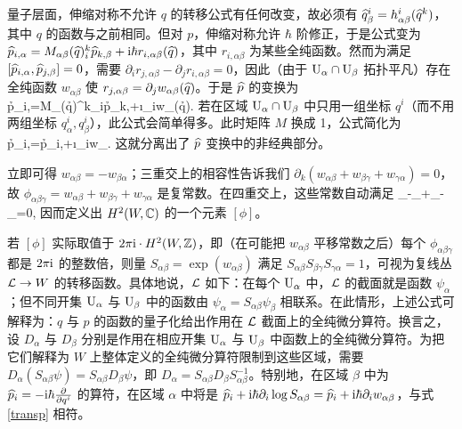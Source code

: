 量子层面，伸缩对称不允许 $q$ 的转移公式有任何改变，故必须有 $\widehat q^i_\beta=h^i_{\alpha\beta}(\widehat q^k)$，其中 $q$ 的函数与之前相同。但对 $p$，伸缩对称允许 $\hbar$ 阶修正，于是公式变为 $\widehat p_{i,\alpha}=M_{\alpha\beta}(\widehat q)^k_i\widehat p_{k,\beta}+{\mathrm i}\hbar r_{i,\alpha\beta}(\widehat q)$，其中 $r_{i,\alpha\beta}$ 为某些全纯函数。然而为满足 $[\widehat p_{i,\alpha},\widehat p_{j,\beta}]=0$，需要 $\partial_ir_{j,\alpha\beta}-\partial_jr_{i,\alpha\beta}=0$，因此（由于 ${\mathrm U}_\alpha\cap{\mathrm U}_\beta$ 拓扑平凡）存在全纯函数 $w_{\alpha\beta}$ 使 $r_{j,\alpha\beta}=\partial_jw_{\alpha\beta}(\widehat q)$。于是 $\widehat p$ 的变换为
\be\label{transp}\h p_{i,\alpha}=M_{\alpha\beta}(\h q)^k_i\h p_{k,\beta}+\i\hbar\partial_iw_{\alpha\beta}(\h q).\ee
若在区域 ${\mathrm U}_\alpha\cap{\mathrm U}_\beta$ 中只用一组坐标 $q^i$（而不用两组坐标 $q^i_\alpha,q^i_\beta$），此公式会简单得多。此时矩阵 $M$ 换成 1，公式简化为
\be\label{transpo}\h p_{i,\alpha}=\h p_{i,\beta}+\i\hbar\partial_iw_{\alpha\beta}.\ee
这就分离出了 $\widehat p$ 变换中的非经典部分。

立即可得 $w_{\alpha\beta}=-w_{\beta\alpha}$；三重交上的相容性告诉我们 $\partial_k(w_{\alpha\beta}+w_{\beta\gamma}+w_{\gamma\alpha})=0$，故 $\phi_{\alpha\beta\gamma}=w_{\alpha\beta}+w_{\beta\gamma}+w_{\gamma\alpha}$ 是复常数。在四重交上，这些常数自动满足
\be\label{cocrel}\phi_{\alpha\beta\gamma}-\phi_{\beta\gamma\delta}+\phi_{\gamma\delta\alpha}-\phi_{\delta\alpha\beta}=0,\ee
因而定义出 $H^2(W,{\mathbb C})$ 的一个元素 $[\phi]$。

若 $[\phi]$ 实际取值于 $2\pi{\mathrm i}\cdot H^2(W,{\mathbb Z})$，即（在可能把 $w_{\alpha\beta}$ 平移常数之后）每个 $\phi_{\alpha\beta\gamma}$ 都是 $2\pi{\mathrm i}$ 的整数倍，则量 $S_{\alpha\beta}=\exp(w_{\alpha\beta})$ 满足 $S_{\alpha\beta}S_{\beta\gamma}S_{\gamma\alpha}=1$，可视为复线丛 ${\mathcal L}\to W$ 的转移函数。具体地说，${\mathcal L}$ 如下：在每个 ${\mathrm U}_\alpha$ 中，${\mathcal L}$ 的截面就是函数 $\psi_\alpha$；但不同开集 ${\mathrm U}_\alpha$ 与 ${\mathrm U}_\beta$ 中的函数由 $\psi_\alpha=S_{\alpha\beta}\psi_\beta$ 相联系。在此情形，上述公式可解释为：$q$ 与 $p$ 的函数的量子化给出作用在 ${\mathcal L}$ 截面上的全纯微分算符。换言之，设 $D_\alpha$ 与 $D_\beta$ 分别是作用在相应开集 ${\mathrm U}_\alpha$ 与 ${\mathrm U}_\beta$ 中函数上的全纯微分算符。为把它们解释为 $W$ 上整体定义的全纯微分算符限制到这些区域，需要 $D_\alpha(S_{\alpha\beta}\psi)=S_{\alpha\beta}D_\beta\psi$，即 $D_\alpha=S_{\alpha\beta}D_\beta S^{-1}_{\alpha\beta}$。特别地，在区域 $\beta$ 中为 $\widehat p_i=-{\mathrm i}\hbar\frac{\partial}{\partial q^i}$ 的算符，在区域 $\alpha$ 中将是 $\widehat p_i+{\mathrm i}\hbar\partial_i\log S_{\alpha\beta}=\widehat p_i+{\mathrm i}\hbar\partial_iw_{\alpha\beta}$，与式 \eqref{transp} 相符。

